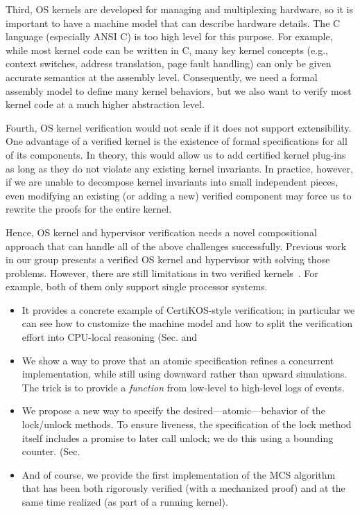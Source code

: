Third, OS kernels are developed for managing and multiplexing hardware, so it is important to have a machine model that can describe hardware details.
The C language (especially ANSI C) is too high level for this purpose. For example, while most kernel code can be written in C, many key kernel concepts (e.g., context switches, address translation, page fault handling) can only be given accurate semantics at the assembly level. Consequently, we need a formal assembly model to define many kernel behaviors, but we also want to verify most kernel code at a much higher abstraction level.

Fourth, OS kernel verification would not scale if it does not  support extensibility.
One advantage of a verified kernel is the existence of formal specifications for all of its components. 
In theory, this would allow us to add certified kernel plug-ins as long as they do not violate any existing kernel invariants.
In practice, however, if we are unable to decompose kernel invariants into small independent pieces, even modifying an existing (or adding a new) verified component may force us to rewrite the proofs for the entire kernel.

Hence, OS kernel and hypervisor verification needs a novel compositional approach that can handle all of the above challenges successfully. 
Previous work~\cite{deepspec} in our group presents a verified OS kernel and hypervisor with solving those problems. 
However, there are still limitations in two verified kernels~\cite{deepspec, klein2009sel4}.
For example, both of them only support single processor systems.
%



\begin{itemize}
\item It provides a concrete example of CertiKOS-style verification; in particular we can see how to customize the machine model    and how to split the verification effort into CPU-local reasoning (Sec. and 
  
\item We show a way to prove that an atomic specification refines a concurrent implementation, while still using downward rather than upward simulations. The trick is to provide a \emph{function} from low-level to high-level logs of events. 
\item We propose a new way to specify the desired---atomic---behavior of the lock/unlock methods. To ensure liveness, the specification of the lock method itself includes a promise to later call unlock; we do this using a bounding counter. (Sec.~

\item And of course, we provide the first implementation of the MCS algorithm that has been both rigorously verified (with a mechanized proof) and at the same time realized (as part of a running kernel).
\end{itemize}




